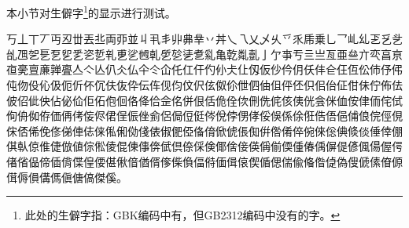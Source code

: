 本小节对生僻字\footnote{此处的生僻字指：GBK编码中有，但GB2312编码中没有的字。}的显示进行测试。

丂丄丅丆丏丒丗丟丠両丣並丩丮丯丱丳丵丷丼乀乁乂乄乆乊乑乕乗乚乛乢乣乤乥乧乨乪乫乬乭乮乯乲乴乵乶乷乸乹乺乻乼乽乿亀亁亃亄亅亇亊亐亖亗亙亜亝亣亪亯亰亱亴亶亷亸亹亼亽亾仈仌仏仐仒仚仛仜仠仢仦仧仩仭仮仯仱仴仸仹仺仼仾伀伂伃伄伅伆伇伈伋伌伒伓伔伕伖伜伝伡伣伨伩伬伭伮伱伳伵伷伹伻伾伿佀佁佂佄佅佇佈佉佊佋佌佒佔佖佡佢佦佨佪佫佭佮佱佲併佷佸佹佺佽侀侁侂侅侇侊侌侎侐侒侓侕侘侙侚侜侞侟価侢侤侫侭侰侱侲侳侴侶侷侸侹侺侻侼侽侾俀俁係俆俇俈俉俋俌俍俒俓俔俕俖俙俛俢俤俥俧俫俬俰俲俴俵俶俷俹俻俼俽俿倀倁倂倃倄倅倇倈倊倎倐倓倕倖倗倛倝倞倠倢倣値倧倯倰倱倲倳倴倵倶倷倸倹倻倽倿偀偁偂偄偅偆偊偋偍偐偑偒偓偔偖偗偘偙偛偝偞偟偠偡偢偣偤偦偧偨偩偪偫偭偮偯偰偱偲偳偸偹偺偼偽傁傂傃傄傆傇傉傊傋傌傎傏傐傑傒。